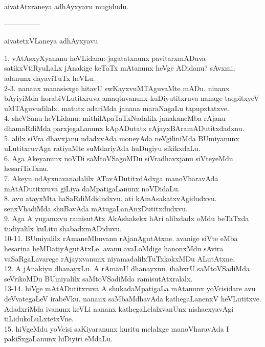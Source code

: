 \documentclass{article}
\begin{document}
\begin{center}
aivatAtxraneya adhAyxyavu mugidudu.
\end{center}

\begin{center}
---------------
\end{center}

\begin{center}
aivatetxVLaneya adhAyxyavu
\end{center}

1. vAtAsxyXyananu heVLidanu:-jagatatxnunx pavitarxmADuva satikxVtiRyuLaLx jAnakige keTaTx mAtanunx heVge ADidanu? sAvxmi, adanunx dayaviTuTx heVLu.\\
2-3. nananx manasisxge hitavU swKayxvuMTAguvaMte mADu. ninanx bAyiyiMda horabiVLutitxruva amaqtavanunx kuDiyutitxruva  nanage taqpitxyeV uMTAguvudilalx. matutx adariMda janana maraNagaLu tapupxtatxve.\\
4. sheVSanu heVLidanu:-mithilApaTaTxNadalilx janakaneMba rAjanu dhamaRdiMda parxjegaLanunx kApADutatx rAjayxBAramADutitxdadxnu.\\
5. alilx siVra dhavxjanu udadxvAda moneyAda neVgiliniMda BUmiyanunx uLutitxruvAga ratiyaMte suMdariyAda huDugiyu sikikxdaLu.\\
6. Aga Akeyanunx noVDi saMtoVSagoMDu siVradhavxjanu siVteyeMdu hesariTaTxnu.\\
7. Akeyu udAyxnavanadalilx ATavADutitxdAdxga manoVharavAda mAtADutitxruva giLiya daMpatigaLanunx noVDidaLu.\\
8. avu atayxMta haSaRdiMdidudxvu. ati kAmAsakatxvAgidudxvu. senxVhadiMda shuBavAda mAtugaLanAnxDutitxdudxvu.\\
9. Aga A yugamxvu ramisutAtx AkAshakekx hAri alilxdadx oMdu beTaTxda tudiyalilx kuLitu shabadxmADiduvu.\\
10-11. BUmiyalilx rAmaneMbuvanu rAjanAgutAtxne. avanige siVte eMba hesarina heMDatiyAgutAtxLe. avanu avaLoMdige hanonxMdu sAvira vaSaRgaLavarege rAjayxvanunx niyamadalilxTuTxkokxMDu ALutAtxne.\\
12. A jAnakiyu dhanayxLu. A rAmanU dhanayxnu. ibabxrU saMtoVSadiMda seVrikoMDu BUmiyalilx saMtoVSadiMda ramisutAtxralalx.\\
13-14. hiVge mAtADutitxruva A shukadaMpatigaLa mAtanunx yoVcisidare avu deVvategaLeV irabeVku. nananx saMbaMdhavAda kathegaLanenxV heVLutitxve. AdadxriMda ivanunx keVLi nananx kathegaLelalxvanUnx nishacxyavAgi tiLidukoLuLxtetxVne.\\
15. hiVgeMdu yoVcisi saKiyaranunx kuritu melalxge manoVharavAda I pakiSxgaLanunx hiDiyiri eMdaLu.\\
\end{document}
